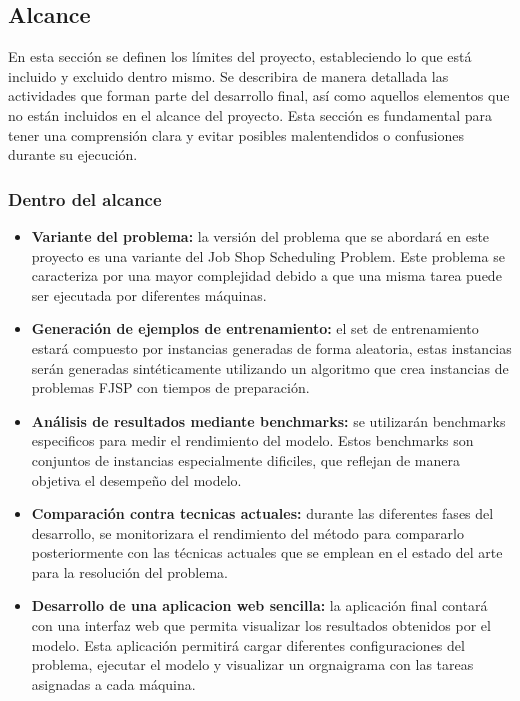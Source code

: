\subsection{Alcance}
En esta sección se definen los límites del proyecto, estableciendo lo que está incluido 
y excluido dentro mismo. Se describira de manera detallada las actividades que forman 
parte del desarrollo final, así como aquellos elementos que no están incluidos en el 
alcance del proyecto. Esta sección es fundamental para tener una comprensión clara 
y evitar posibles malentendidos o confusiones durante su ejecución.

\subsubsection{Dentro del alcance}
\begin{itemize}
    \item \textbf{Variante del problema:} la versión del problema que se abordará en este proyecto
    es una variante del Job Shop Scheduling Problem. Este problema se caracteriza por una mayor
    complejidad debido a que una misma tarea puede ser ejecutada por diferentes máquinas.
    \item \textbf{Generación de ejemplos de entrenamiento:} el set de entrenamiento estará compuesto
    por instancias generadas de forma aleatoria, estas instancias serán generadas sintéticamente 
    utilizando un algoritmo que crea instancias de problemas FJSP con tiempos de preparación. 
    \item \textbf{Análisis de resultados mediante benchmarks:} se utilizarán benchmarks
    especificos para medir el rendimiento del modelo. Estos benchmarks son conjuntos de instancias
    especialmente dificiles, que reflejan de manera objetiva el desempeño del modelo.
    \item \textbf{Comparación contra tecnicas actuales:} durante las diferentes fases del desarrollo,
    se monitorizara el rendimiento del método para compararlo posteriormente con las técnicas actuales 
    que se emplean en el estado del arte para la resolución del problema. 
    \item \textbf{Desarrollo de una aplicacion web sencilla:} la aplicación final contará con una interfaz 
    web que permita visualizar los resultados obtenidos por el modelo. Esta aplicación
    permitirá cargar diferentes configuraciones del problema, ejecutar el modelo y visualizar
    un orgnaigrama con las tareas asignadas a cada máquina.
\end{itemize}

